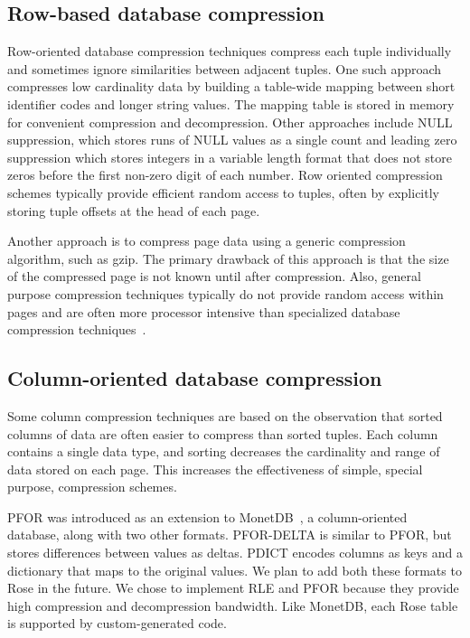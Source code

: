 \documentclass{vldb}
\newcommand{\rows}{Rose\xspace}
\begin{document}
\subsection{Row-based database compression}
Row-oriented database compression techniques compress each tuple
individually and sometimes ignore similarities between adjacent
tuples.  One such approach compresses low cardinality data by building
a table-wide mapping between short identifier codes and longer string
values. The mapping table is stored in memory for convenient
compression and decompression.  Other approaches include NULL
suppression, which stores runs of NULL values as a single count and
leading zero suppression which stores integers in a variable length
format that does not store zeros before the first non-zero digit of each
number.  Row oriented compression schemes typically provide efficient random access to
tuples, often by explicitly storing tuple offsets at the head of each page.

Another approach is to compress page data using a generic compression
algorithm, such as gzip.  The primary drawback of this approach is
that the size of the compressed page is not known until after
compression.  Also, general purpose compression techniques typically
do not provide random access within pages and are often more processor
intensive than specialized database compression
techniques~\cite{rowImplementationPerf}.

\subsection{Column-oriented database compression}

Some column compression techniques are based on the observation that sorted
columns of data are often easier to compress than sorted tuples.  Each
column contains a single data type, and sorting decreases the
cardinality and range of data stored on each page.  This increases the
effectiveness of simple, special purpose, compression schemes.

PFOR was introduced as an extension to
MonetDB~\cite{pfor}, a column-oriented database, along with two other
formats.  PFOR-DELTA is similar to PFOR, but stores differences between values as
deltas.  PDICT encodes columns as keys and a dictionary that
maps to the original values.  We plan to add both these formats to
\rows in the future.  We chose to implement RLE and PFOR because they
provide high compression and decompression bandwidth.  Like MonetDB,
each \rows table is supported by custom-generated code.
\end{document}
